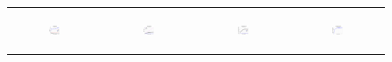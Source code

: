 ~\newpage\begin{figure}[ht]
  \centering
  \begin{tabular}{cccc}
	  \begin{subfigure}[h]{0.22\textwidth}
	  	\includegraphics[width=105pt]{images/runtime_ring_setcover.pdf}
			\caption{}
			\label{appfig:runtime_ring_setcover}
	  \end{subfigure} &
	  \begin{subfigure}[h]{0.22\textwidth}
	  	\includegraphics[width=105pt]{images/speedup_ring_setcover.pdf}
			\caption{}
			\label{appfig:speedup_ring_setcover}
	  \end{subfigure} &
	  \begin{subfigure}[h]{0.22\textwidth}
	  	\includegraphics[width=105pt]{images/diffFA_CF2G_ring_setcover.pdf}
			\caption{}
			\label{appfig:diffFA_CF2G_ring_setcover}
	  \end{subfigure} &
	  \begin{subfigure}[h]{0.22\textwidth}
	  	\includegraphics[width=105pt]{images/validated_CC2G_ring_setcover.pdf}
			\caption{}
			\label{appfig:validated_CC2G_ring_setcover}
	  \end{subfigure} \\

\end{tabular}
\end{figure}
